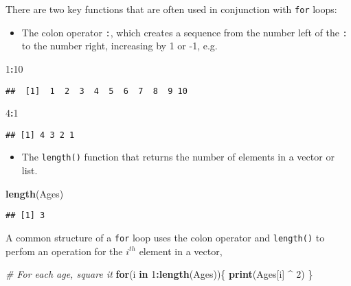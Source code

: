 \documentclass[
]{article}
\newenvironment{Shaded}{\begin{snugshade}}{\end{snugshade}}
\newcommand{\CommentTok}[1]{\textcolor[rgb]{0.56,0.35,0.01}{\textit{#1}}}
\newcommand{\ControlFlowTok}[1]{\textcolor[rgb]{0.13,0.29,0.53}{\textbf{#1}}}
\newcommand{\DecValTok}[1]{\textcolor[rgb]{0.00,0.00,0.81}{#1}}
\newcommand{\KeywordTok}[1]{\textcolor[rgb]{0.13,0.29,0.53}{\textbf{#1}}}
\newcommand{\NormalTok}[1]{#1}
\newcommand{\OperatorTok}[1]{\textcolor[rgb]{0.81,0.36,0.00}{\textbf{#1}}}
\newcommand{\StringTok}[1]{\textcolor[rgb]{0.31,0.60,0.02}{#1}}
\providecommand{\tightlist}{%
  \setlength{\itemsep}{0pt}\setlength{\parskip}{0pt}}
\begin{document}
There are two key functions that are often used in conjunction with
\texttt{for} loops:

\begin{itemize}
\tightlist
\item
  The colon operator \texttt{:}, which creates a sequence from the
  number left of the \texttt{:} to the number right, increasing by 1 or
  -1, e.g.
\end{itemize}

\begin{Shaded}
\begin{Highlighting}[]
\DecValTok{1}\OperatorTok{:}\DecValTok{10}
\end{Highlighting}
\end{Shaded}

\begin{verbatim}
##  [1]  1  2  3  4  5  6  7  8  9 10
\end{verbatim}

\begin{Shaded}
\begin{Highlighting}[]
\DecValTok{4}\OperatorTok{:}\DecValTok{1} 
\end{Highlighting}
\end{Shaded}

\begin{verbatim}
## [1] 4 3 2 1
\end{verbatim}

\begin{itemize}
\tightlist
\item
  The \texttt{length()} function that returns the number of elements in
  a vector or list.
\end{itemize}

\begin{Shaded}
\begin{Highlighting}[]
\KeywordTok{length}\NormalTok{(Ages)}
\end{Highlighting}
\end{Shaded}

\begin{verbatim}
## [1] 3
\end{verbatim}

A common structure of a \texttt{for} loop uses the colon operator and
\texttt{length()} to perfom an operation for the \(i^{th}\) element in a
vector,

\begin{Shaded}
\begin{Highlighting}[]
\CommentTok{# For each age, square it}
\ControlFlowTok{for}\NormalTok{(i }\ControlFlowTok{in} \DecValTok{1}\OperatorTok{:}\KeywordTok{length}\NormalTok{(Ages))\{}
  \KeywordTok{print}\NormalTok{(Ages[i] }\OperatorTok{^}\StringTok{ }\DecValTok{2}\NormalTok{)}
\NormalTok{\}}
\end{Highlighting}
\end{Shaded}
\end{document}
